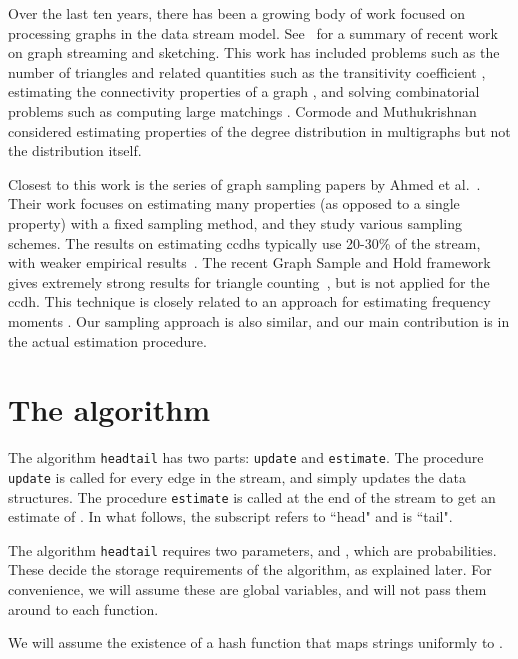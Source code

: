 \documentclass[11pt]{article}
\theoremstyle{definition}
\newcommand{\degdist}{{\tt headtail}}
\newcommand{\update}{{\tt update}}
\newcommand{\est}{{\tt estimate}}
\begin{document}
Over the last ten years, there has been a growing body of work focused on processing graphs in the data stream model. See~\cite{mcgregor2014graph} for a summary of recent work on graph streaming and sketching. This work has included problems such as the number of triangles and related quantities such as the transitivity coefficient \cite{jha2013space,PavanTTW13,ahmed2014graph}, estimating the connectivity properties of a graph \cite{GuhaMT15}, and solving combinatorial problems such as computing large matchings \cite{KapralovKS14,McGregor05}.
Cormode and Muthukrishnan considered estimating properties of the degree
distribution in multigraphs but not the distribution itself\cite{CormodeM05}.

Closest to this work is the series of graph sampling papers by Ahmed et al.~\cite{ayman2013ads,ahmed12socialnets,ahmed2014network,ahmed2014graph}.
Their work focuses on estimating many properties (as opposed to a single property) with a fixed sampling method, and they study various sampling schemes.
The results on estimating ccdhs typically use 20-30\% of the stream, with weaker empirical results~\cite{ayman2013ads}.
The recent Graph Sample and Hold framework gives extremely strong results for triangle counting~\cite{ahmed2014graph}, but is
not applied for the ccdh.
This technique is closely related to an approach for estimating frequency moments
\cite{AlonMS99,braverman2013approximating}. Our sampling approach is also similar, and our main
contribution is in the actual estimation procedure.








\section{The algorithm}

The algorithm \degdist{} has two parts: \update{} and \est.
The procedure \update{} is called for every edge in the stream, and simply
updates the data structures. The procedure \est{} is called at the end
of the stream to get an estimate of . In what follows,
the subscript  refers to ``head" and  is ``tail".

The algorithm \degdist{} requires two parameters,  and , which
are probabilities. These decide the storage requirements of the algorithm,
as explained later. For convenience, we will assume these are global variables,
and will not pass them around to each function.

We will assume the existence of a hash function  that maps strings
uniformly to .
\end{document}
